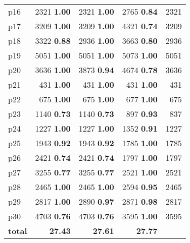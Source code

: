 \begin{tabular}{|l|rrr|r|}
p16 & {\footnotesize 2321} \textbf{1.00} & {\footnotesize 2321} \textbf{1.00} & {\footnotesize 2765} \textbf{0.84} & 2321\\
p17 & {\footnotesize 3209} \textbf{1.00} & {\footnotesize 3209} \textbf{1.00} & {\footnotesize 4321} \textbf{0.74} & 3209\\
p18 & {\footnotesize 3322} \textbf{0.88} & {\footnotesize 2936} \textbf{1.00} & {\footnotesize 3663} \textbf{0.80} & 2936\\
p19 & {\footnotesize 5051} \textbf{1.00} & {\footnotesize 5051} \textbf{1.00} & {\footnotesize 5073} \textbf{1.00} & 5051\\
p20 & {\footnotesize 3636} \textbf{1.00} & {\footnotesize 3873} \textbf{0.94} & {\footnotesize 4674} \textbf{0.78} & 3636\\
p21 & {\footnotesize 431} \textbf{1.00} & {\footnotesize 431} \textbf{1.00} & {\footnotesize 431} \textbf{1.00} & 431\\
p22 & {\footnotesize 675} \textbf{1.00} & {\footnotesize 675} \textbf{1.00} & {\footnotesize 677} \textbf{1.00} & 675\\
p23 & {\footnotesize 1140} \textbf{0.73} & {\footnotesize 1140} \textbf{0.73} & {\footnotesize 897} \textbf{0.93} & 837\\
p24 & {\footnotesize 1227} \textbf{1.00} & {\footnotesize 1227} \textbf{1.00} & {\footnotesize 1352} \textbf{0.91} & 1227\\
p25 & {\footnotesize 1943} \textbf{0.92} & {\footnotesize 1943} \textbf{0.92} & {\footnotesize 1785} \textbf{1.00} & 1785\\
p26 & {\footnotesize 2421} \textbf{0.74} & {\footnotesize 2421} \textbf{0.74} & {\footnotesize 1797} \textbf{1.00} & 1797\\
p27 & {\footnotesize 3255} \textbf{0.77} & {\footnotesize 3255} \textbf{0.77} & {\footnotesize 2521} \textbf{1.00} & 2521\\
p28 & {\footnotesize 2465} \textbf{1.00} & {\footnotesize 2465} \textbf{1.00} & {\footnotesize 2594} \textbf{0.95} & 2465\\
p29 & {\footnotesize 2817} \textbf{1.00} & {\footnotesize 2890} \textbf{0.97} & {\footnotesize 2871} \textbf{0.98} & 2817\\
p30 & {\footnotesize 4703} \textbf{0.76} & {\footnotesize 4703} \textbf{0.76} & {\footnotesize 3595} \textbf{1.00} & 3595\\
\hline
\textbf{total} & \textbf{27.43} & \textbf{27.61} & \textbf{27.77} & \\
\hline
\end{tabular}

